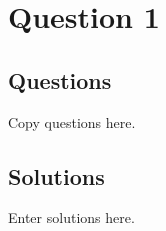 \chapter{Question 1}
\section{Questions}
Copy questions here.

\section{Solutions}
Enter solutions here.
